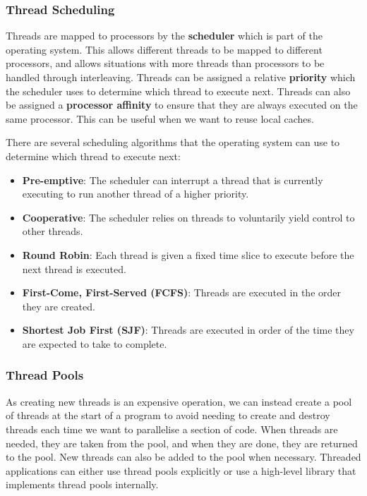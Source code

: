 \documentclass{article}
\begin{document}
\subsubsection{Thread Scheduling}
Threads are mapped to processors by the \textbf{scheduler} which is
part of the operating system. This allows different threads to be
mapped to different processors, and allows situations with more threads
than processors to be handled through interleaving. Threads can be
assigned a relative \textbf{priority} which the scheduler uses to
determine which thread to execute next. Threads can also be assigned a
\textbf{processor affinity} to ensure that they are always executed on
the same processor. This can be useful when we want to reuse local
caches.

There are several scheduling algorithms that the operating system can
use to determine which thread to execute next:
\begin{itemize}
    \item \textbf{Pre-emptive}: The scheduler can interrupt a thread
          that is currently executing to run another thread of a higher
          priority.
    \item \textbf{Cooperative}: The scheduler relies on threads to
          voluntarily yield control to other threads.
    \item \textbf{Round Robin}: Each thread is given a fixed time slice
          to execute before the next thread is executed.
    \item \textbf{First-Come, First-Served (FCFS)}: Threads are executed
          in the order they are created.
    \item \textbf{Shortest Job First (SJF)}: Threads are executed in
          order of the time they are expected to take to complete.
\end{itemize}
\subsubsection{Thread Pools}
As creating new threads is an expensive operation, we can instead
create a pool of threads at the start of a program to avoid needing to
create and destroy threads each time we want to parallelise a section
of code. When threads are needed, they are taken from the pool, and
when they are done, they are returned to the pool. New threads can also
be added to the pool when necessary. Threaded applications can either
use thread pools explicitly or use a high-level library that implements
thread pools internally.
\end{document}
